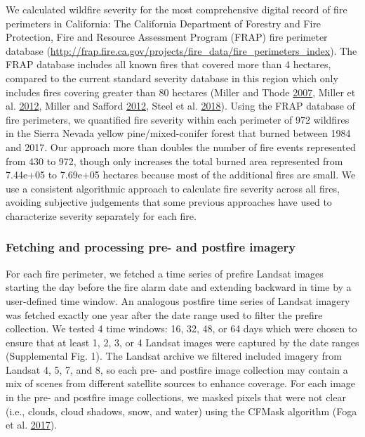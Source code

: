 \documentclass[twoside,12pt,final]{ucthesis-CA2012}
\begin{document}
\begin{ucmainmatter}
We calculated wildfire severity for the most comprehensive digital
record of fire perimeters in California: The California Department of
Forestry and Fire Protection, Fire and Resource Assessment Program
(FRAP) fire perimeter database
(\url{http://frap.fire.ca.gov/projects/fire_data/fire_perimeters_index}).
The FRAP database includes all known fires that covered more than 4
hectares, compared to the current standard severity database in this
region which only includes fires covering greater than 80 hectares
(Miller and Thode \protect\hyperlink{ref-miller2007}{2007}, Miller et
al. \protect\hyperlink{ref-miller2012}{2012}, Miller and Safford
\protect\hyperlink{ref-miller2012a}{2012}, Steel et al.
\protect\hyperlink{ref-steel2018}{2018}). Using the FRAP database of
fire perimeters, we quantified fire severity within each perimeter of
972 wildfires in the Sierra Nevada yellow pine/mixed-conifer forest that
burned between 1984 and 2017. Our approach more than doubles the number
of fire events represented from 430 to 972, though only increases the
total burned area represented from 7.44e+05 to 7.69e+05 hectares because
most of the additional fires are small. We use a consistent algorithmic
approach to calculate fire severity across all fires, avoiding
subjective judgements that some previous approaches have used to
characterize severity separately for each fire.

\subsubsection{Fetching and processing pre- and postfire
imagery}\label{fetching-and-processing-pre--and-postfire-imagery}

For each fire perimeter, we fetched a time series of prefire Landsat
images starting the day before the fire alarm date and extending
backward in time by a user-defined time window. An analogous postfire
time series of Landsat imagery was fetched exactly one year after the
date range used to filter the prefire collection. We tested 4 time
windows: 16, 32, 48, or 64 days which were chosen to ensure that at
least 1, 2, 3, or 4 Landsat images were captured by the date ranges
(Supplemental Fig. 1). The Landsat archive we filtered included imagery
from Landsat 4, 5, 7, and 8, so each pre- and postfire image collection
may contain a mix of scenes from different satellite sources to enhance
coverage. For each image in the pre- and postfire image collections, we
masked pixels that were not clear (i.e., clouds, cloud shadows, snow,
and water) using the CFMask algorithm (Foga et al.
\protect\hyperlink{ref-foga2017}{2017}).


\end{ucmainmatter}
\end{document}
